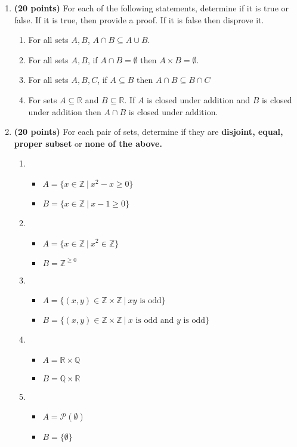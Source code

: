 \documentclass[10pt,letterpaper,unboxed,cm]{article}
\begin{document}
\begin{enumerate}
\begin{enumerate}
\end{enumerate}
\item {\bf (20 points)}
For each of the following statements, determine if it is true or false. If it is true, then provide a proof. If it is false then disprove it.
\begin{enumerate}
\item
For all sets $A,B$, $A\cap B\subseteq A\cup B$.
\item
For all sets $A,B$, if $A\cap B=\emptyset$ then $A\times B=\emptyset$.
\item
For all sets $A,B,C$, if $A\subseteq B$ then $A\cap B\subseteq B\cap C$
\item
For sets $A\subseteq \mathbb{R}$ and $B\subseteq \mathbb{R}$. If $A$ is closed under addition and $B$ is closed under addition then $A\cap B$ is closed under addition.
\end{enumerate}
\item {\bf (20 points)}
For each pair of sets, determine if they are {\bf disjoint, equal, proper subset} or {\bf none of the above.}
\begin{enumerate}
\item
\begin{itemize}
\item
$A=\{x\in\mathbb{Z}~|~x^2- x\geq 0\}$
\item
$B=\{x\in\mathbb{Z}~|~x-1\geq 0\}$
\end{itemize}
\item
\begin{itemize}
\item
$A=\{x\in\mathbb{Z}~|~x^2\in \mathbb{Z}\}$
\item
$B=\mathbb{Z}^{\geq 0}$
\end{itemize}
\item
\begin{itemize}
\item
$A=\{(x,y)\in\mathbb{Z}\times\mathbb{Z}~|~\text{$xy$ is odd}\}$
\item
$B=\{(x,y)\in\mathbb{Z}\times\mathbb{Z}~|~\text{$x$ is odd and $y$ is odd}\}$
\end{itemize}
\item
\begin{itemize}
\item
$A=\mathbb{R}\times\mathbb{Q}$
\item
$B=\mathbb{Q}\times\mathbb{R}$
\end{itemize}
\item
\begin{itemize}
\item
$A=\mathcal{P}(\emptyset)$
\item
$B=\{\emptyset\}$
\end{itemize}
\end{enumerate}

\end{enumerate}
\end{document}
